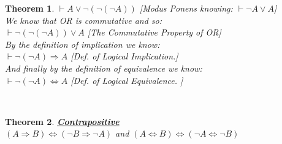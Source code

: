 \documentclass[12pt]{extarticle}
\theoremstyle{plain}
\newtheorem{thm}{Theorem}[section]
\theoremstyle{plain}
\theoremstyle{plain}
\theoremstyle{Definition}
\theoremstyle{Definition}
\theoremstyle{plain}
\theoremstyle{plain}
\newcommand{\cut}[0]{\noindent\framebox[\linewidth]{\rule{\linewidth}{2pt}}\\}
\begin{document}
\begin{thm}
	$\vdash A \lor \lnot (\lnot (\lnot A))  $ \hfill [Modus Ponens knowing: $\vdash \lnot A \lor A $]\\	
	We know that OR is commutative and so: \\ 
	$\vdash \lnot (\lnot (\lnot A))  \lor A$ \hfill [The Commutative Property of OR]\\
	By the definition of implication we know: \\ 
	$\vdash \lnot (\lnot A) \Rightarrow A$ \hfill [Def. of Logical Implication.]\\
	And finally by the definition of equivalence we know: \\ 
	$\vdash \lnot (\lnot A) \Leftrightarrow A$	\hfill [Def. of Logical Equivalence. ]
\end{thm}
\cut
\begin{thm} \underline{\textbf{Contrapositive}} \\ 
	$(A \Rightarrow B) \Leftrightarrow (\lnot B \Rightarrow \lnot A)$ and $(A \Leftrightarrow B) \Leftrightarrow (\lnot A \Leftrightarrow \lnot B)$ 
	
\end{thm}
\cut 
\end{document}
